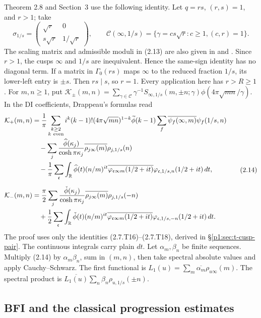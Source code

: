 Theorem 2.8 and Section~3 use the following identity. Let $q=rs$, $(r,s)=1$, and $r>1$; take
\[
 \sigma_{1/s}=\begin{pmatrix}\sqrt r&0\\s\sqrt r&1/\sqrt r\end{pmatrix},
 \qquad
 \mathcal C(\infty,1/s)=\{\gamma=cs\sqrt r:c\geq1, (c,r)=1\}.
\tag{2.13}\label{p1:eq:2.13}
\]
The scaling matrix and admissible moduli in (2.13) are also given in
\cite[(1.6) and (2.4)]{DI82} and \cite[Lemma~4.3]{Drappeau}.
Since $r>1$, the cusps $\infty$ and $1/s$ are inequivalent. Hence the same-sign identity has no diagonal term. If a matrix in $\Gamma_0(rs)$ maps $\infty$ to the reduced fraction $1/s$, its lower-left entry is $\pm s$. Then $rs\mid s$, so $r=1$. Every application here has $r>R\geq1$. For $m,n\geq1$, put $\mathcal K_\pm(m,n)=\sum_{\gamma\in\mathcal C}\gamma^{-1}S_{\infty,1/s}(m,\pm n;\gamma)\phi(4\pi\sqrt{mn}/\gamma)$. In the DI coefficients, Drappeau's formulas read
\[
\begin{split}
 \mathcal K_+(m,n)
 &=\frac1\pi\sum_{\substack{k\geq2\\k\ {\rm even}}}
 i^k(k-1)!(4\pi\sqrt{mn})^{1-k}\widetilde\phi(k-1)
 \sum_f\overline{\psi_f(\infty,m)}\psi_f(1/s,n)\\
 &\quad-\sum_j\frac{\widehat\phi(\kappa_j)}{\cosh\pi\kappa_j}
 \overline{\rho_{j\infty}(m)}\rho_{j,1/s}(n)\\
 &\quad-\frac1\pi\sum_{\mathfrak c}\int_{\mathbb R}
 \widehat\phi(t)(n/m)^{it}
 \overline{\varphi_{\mathfrak c\infty m}(1/2+it)}
 \varphi_{\mathfrak c,1/s,n}(1/2+it)\,dt,\\[2mm]
 \mathcal K_-(m,n)
 &=\frac\pi2\sum_j\frac{\check\phi(\kappa_j)}{\cosh\pi\kappa_j}
 \overline{\rho_{j\infty}(m)}\rho_{j,1/s}(-n)\\
 &\quad+\frac12\sum_{\mathfrak c}\int_{\mathbb R}
 \check\phi(t)(n/m)^{it}
 \overline{\varphi_{\mathfrak c\infty m}(1/2+it)}
 \varphi_{\mathfrak c,1/s,-n}(1/2+it)\,dt.
\end{split}
\tag{2.14}\label{p1:eq:2.14}
\]
The proof uses only the identities (2.7.T16)--(2.7.T18), derived in \S\ref{p1:sec:t-cusp-pair}. The continuous integrals carry plain $dt$. Let $\alpha_m,\beta_n$ be finite sequences. Multiply (2.14) by $\alpha_m\beta_n$, sum in $(m,n)$, then take spectral absolute values and apply Cauchy--Schwarz. The first functional is $L_1(u)=\sum_m\overline{\alpha_m}\rho_{u\infty}(m)$. The spectral product is $\overline{L_1(u)}\sum_n\beta_n\rho_{u,1/s}(\pm n)$.

\subsection{BFI and the classical progression estimates}

